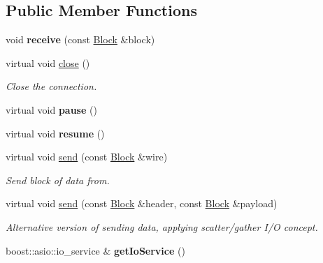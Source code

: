 \subsection*{Public Member Functions}
\begin{DoxyCompactItemize}
\item 
void {\bfseries receive} (const \hyperlink{classndn_1_1Block}{Block} \&block)\hypertarget{classndn_1_1util_1_1DummyClientFace_1_1Transport_a44767843fd2738906491c7df95cb181b}{}\label{classndn_1_1util_1_1DummyClientFace_1_1Transport_a44767843fd2738906491c7df95cb181b}

\item 
virtual void \hyperlink{classndn_1_1util_1_1DummyClientFace_1_1Transport_a2ae779084c056bf6348de6b3c21ed95b}{close} ()\hypertarget{classndn_1_1util_1_1DummyClientFace_1_1Transport_a2ae779084c056bf6348de6b3c21ed95b}{}\label{classndn_1_1util_1_1DummyClientFace_1_1Transport_a2ae779084c056bf6348de6b3c21ed95b}

\begin{DoxyCompactList}\small\item\em Close the connection. \end{DoxyCompactList}\item 
virtual void {\bfseries pause} ()\hypertarget{classndn_1_1util_1_1DummyClientFace_1_1Transport_a33ab3e329589f650a8314b71995641a9}{}\label{classndn_1_1util_1_1DummyClientFace_1_1Transport_a33ab3e329589f650a8314b71995641a9}

\item 
virtual void {\bfseries resume} ()\hypertarget{classndn_1_1util_1_1DummyClientFace_1_1Transport_abcf21b634bfaf77348a7fcb252beedde}{}\label{classndn_1_1util_1_1DummyClientFace_1_1Transport_abcf21b634bfaf77348a7fcb252beedde}

\item 
virtual void \hyperlink{classndn_1_1util_1_1DummyClientFace_1_1Transport_a5644627bcc07ee795d8b55bc79208257}{send} (const \hyperlink{classndn_1_1Block}{Block} \&wire)
\begin{DoxyCompactList}\small\item\em Send block of data from. \end{DoxyCompactList}\item 
virtual void \hyperlink{classndn_1_1util_1_1DummyClientFace_1_1Transport_a0c82633be8b1459268376b8eb64edab8}{send} (const \hyperlink{classndn_1_1Block}{Block} \&header, const \hyperlink{classndn_1_1Block}{Block} \&payload)
\begin{DoxyCompactList}\small\item\em Alternative version of sending data, applying scatter/gather I/O concept. \end{DoxyCompactList}\item 
boost\+::asio\+::io\+\_\+service \& {\bfseries get\+Io\+Service} ()\hypertarget{classndn_1_1util_1_1DummyClientFace_1_1Transport_aaadf09b33987d8b824830cc0cd2e1382}{}\label{classndn_1_1util_1_1DummyClientFace_1_1Transport_aaadf09b33987d8b824830cc0cd2e1382}

\end{DoxyCompactItemize}
